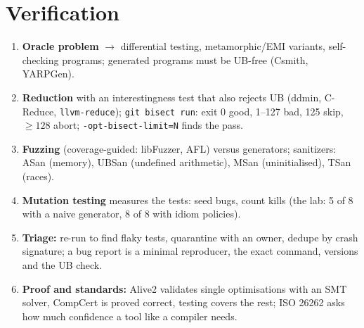\documentclass[10pt,a4paper,openany,oneside]{report}
\begin{document}
\section*{Verification}
\begin{enumerate}[nosep,leftmargin=2.2em,start=27,label=\textbf{\arabic*.}]
\item \textbf{Oracle problem} $\to$ differential testing, metamorphic/EMI variants, self-checking programs; generated programs must be UB-free (Csmith, YARPGen).
\item \textbf{Reduction} with an interestingness test that also rejects UB (ddmin, C-Reduce, \texttt{llvm-reduce}); \texttt{git bisect run}: exit 0 good, 1--127 bad, 125 skip, $\ge128$ abort; \texttt{-opt-bisect-limit=N} finds the pass.
\item \textbf{Fuzzing} (coverage-guided: libFuzzer, AFL) versus generators; sanitizers: ASan (memory), UBSan (undefined arithmetic), MSan (uninitialised), TSan (races).
\item \textbf{Mutation testing} measures the tests: seed bugs, count kills (the lab: 5 of 8 with a naive generator, 8 of 8 with idiom policies).
\item \textbf{Triage:} re-run to find flaky tests, quarantine with an owner, dedupe by crash signature; a bug report is a minimal reproducer, the exact command, versions and the UB check.
\item \textbf{Proof and standards:} Alive2 validates single optimisations with an SMT solver, CompCert is proved correct, testing covers the rest; ISO 26262 asks how much confidence a tool like a compiler needs.
\end{enumerate}
\end{document}
